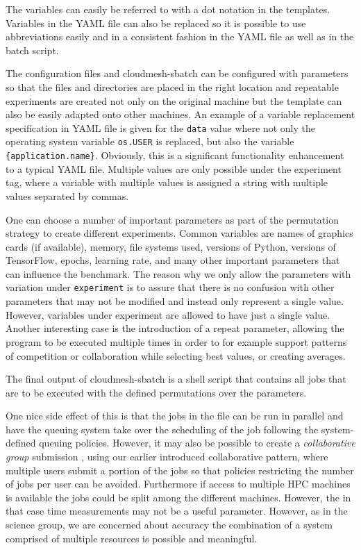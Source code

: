 \documentclass[utf8]{FrontiersinVancouver} %
\begin{document}
The variables can easily be referred to with a dot notation in the
templates.  Variables in the YAML file can also be replaced so it is
possible to use abbreviations easily and in a consistent fashion in
the YAML file as well as in the batch script.

The configuration files and cloudmesh-sbatch can be configured with
parameters so that the files and directories are placed in the right
location and repeatable experiments are created not only on the
original machine but the template can also be easily adapted onto
other machines. An example of a variable replacement specification in
YAML file is given for the \verb|data| value where not only the
operating system variable \verb|os.USER| is replaced, but also the
variable \verb|{application.name}|. Obviously, this is a significant
functionality enhancement to a typical YAML file.  Multiple values are
only possible under the experiment tag, where a variable with multiple
values is assigned a string with multiple values separated by commas.

One can choose a number of important parameters as part of the
permutation strategy to create different experiments. Common variables
are names of graphics cards (if available), memory, file systems used,
versions of Python, versions of TensorFlow, epochs, learning rate, and
many other important parameters that can influence the benchmark.  The
reason why we only allow the parameters with variation under
\verb|experiment| is to assure that there is no confusion with other
parameters that may not be modified and instead only represent a
single value. However, variables under experiment are allowed to have
just a single value.  Another interesting case is the introduction of
a repeat parameter, allowing the program to be executed multiple times
in order to for example support patterns of competition or
collaboration while selecting best values, or creating averages.


The final output of cloudmesh-sbatch is a shell script that contains
all jobs that are to be executed with the defined permutations over the
parameters.

One nice side effect of this is that the jobs in the file can be run
in parallel and have the queuing system take over the scheduling of
the job following the system-defined queuing policies. However, it may
also be possible to create a {\it collaborative group} submission ,
using our earlier introduced collaborative pattern, where multiple
users submit a portion of the jobs so that policies restricting the
number of jobs per user can be avoided. Furthermore if access to
multiple HPC machines is available the jobs could be split among the
different machines. However, the in that case time measurements may
not be a useful parameter. However, as in the science group, we are
concerned about accuracy the combination of a system comprised of
multiple resources is possible and meaningful.
\end{document}

